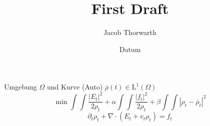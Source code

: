\documentclass[12pt]{article}
\title{First Draft}
\author{Jacob Thorwarth}
\date{Datum}
\theoremstyle{definition}
\theoremstyle{remark}
\begin{document}
\maketitle


Umgebung $\Omega$ und Kurve (Auto) $\overline{\rho}(t)\in \mathrm{L}^1(\Omega)$
$$
\min \int\int \frac{|E_t|^2}{2\rho_t} + \alpha \int\int\frac{|f_t|^2}{2\rho_t}+\beta\int\int|\rho_t-\overline{\rho}_t|^2
$$
$$
\partial_t\rho_t + \nabla \cdot (E_t + v_t\rho_t) = f_t
$$
\end{document}
